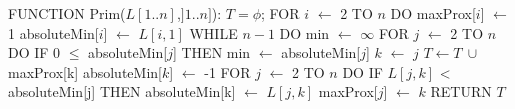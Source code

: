 FUNCTION Prim($L[1..n]$,$]1..n]$):
  $T = \phi$;
  FOR $i$ $\leftarrow$ 2 TO $n$ DO 
  maxProx[$i$] $\leftarrow$ 1
  absoluteMin[$i$] $\leftarrow$ $L[i,1]$
  WHILE $n-1$ DO
     min $\leftarrow$ $\infty$
     FOR $j$ $\leftarrow$ 2 TO $n$ DO 
        IF 0 $\leq$ absoluteMin[$j$] THEN min $\leftarrow$ absoluteMin[$j$]
           $k$ $\leftarrow$ $j$
     $T \leftarrow T\ \cup $ maxProx[k]
     absoluteMin[$k$] $\leftarrow$ -1
     FOR $j$ $\leftarrow$ 2 TO $n$ DO 
        IF $L[j,k]$ < absoluteMin[j] THEN absoluteMin[k] $\leftarrow$ $L[j,k]$
           maxProx[$j$] $\leftarrow$ $k$
   RETURN $T$